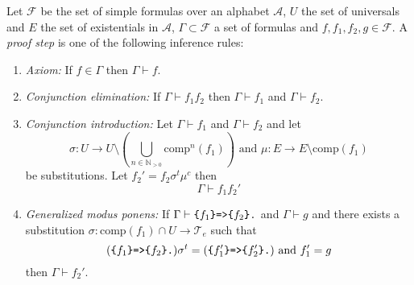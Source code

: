 \begin{definition}\label{proofsteps}
Let $\mathcal{F}$ be the set of simple formulas over an \nthree alphabet $\mathcal{A}$, $U$ the set of universals and $E$ the set of existentials in $\mathcal{A}$,  $\Gamma\subset \mathcal{F}$ a set of formulas and
$f,f_1,f_2, g\in \mathcal{F}$. 
A \textit{proof step} is one of the following inference rules:
\begin{enumerate}
 \item \emph{Axiom:} If $f \in \Gamma$ then $\Gamma \vdash f$.%
 \item \emph{Conjunction elimination:} If $\Gamma \vdash f_1f_2$ then $\Gamma \vdash f_1$ and $\Gamma \vdash f_2$.
 \item \emph{Conjunction introduction:} Let $\Gamma\vdash f_1$ and $\Gamma \vdash f_2$ and 
 let \[\sigma: U\rightarrow U\setminus (\bigcup_{n\in \mathbb{N}_{>0}}\text{comp}^n(f_1) )  %
 \text{ and } %
 \mu:E\rightarrow E\setminus \text{comp}(f_1)\] be substitutions. Let $f_2'= f_2\sigma^t\mu^c$ 
then \[\Gamma \vdash f_1f_2'\]
 \item \emph{Generalized modus ponens:} If $\Gamma \vdash \verb!{!f_1\verb!}=>{!f_2\verb!}.!$ and $\Gamma \vdash g$ %
 and there exists a substitution $\sigma:\text{comp}(f_1)\cap U \rightarrow \mathcal{T}_e$ such that 
 \[
  (\verb!{!f_1\verb!}=>{!f_2\verb!}.!)\sigma^t= (\verb!{!f_1'\verb!}=>{!f_2'\verb!}.!)\text{ and }
 f'_1=g\] 
then $\Gamma \vdash f_2'$.
 \end{enumerate}
\end{definition}


